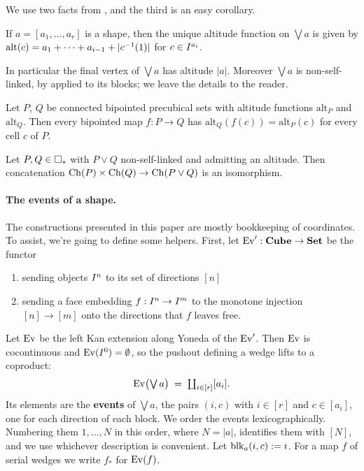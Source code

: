 \documentclass[11pt]{article}
\begin{document}
We use two facts from \cite{PZ}, and the third is an easy corollary.

\begin{lemma}[{\cite[Ex.~2.6(c)]{PZ}}]\label{lem:wedge-altitude}
  If $a = [a_1,\dots,a_r]$ is a shape, then the unique altitude function on $\bigvee a$ is given
  by $\mathrm{alt}(c) = a_1 + \cdots + a_{i-1} + |c^{-1}(1)|$ for $c \in I^{a_i}$.
\end{lemma}

In particular the final vertex of $\bigvee a$ has altitude $|a|$. Moreover $\bigvee a$ is
non-self-linked, by \cite[Prop.~2.10]{PZ} applied to its blocks; we leave the details to the
reader.

\begin{lemma}[{\cite[Prop.~2.7]{PZ}}]\label{lem:altitude-preserved}
  Let $P$, $Q$ be connected bipointed precubical sets with altitude functions $\mathrm{alt}_P$ and
  $\mathrm{alt}_Q$. Then every bipointed map $f : P \to Q$ has
  $\mathrm{alt}_Q(f(c)) = \mathrm{alt}_P(c)$ for every cell $c$ of $P$.
\end{lemma}

\begin{lemma}\label{lem:concat}
  Let $P, Q \in \square_{*}$ with $P \vee Q$ non-self-linked and admitting an altitude. Then
  concatenation $\operatorname{Ch}(P) \times \operatorname{Ch}(Q) \to \operatorname{Ch}(P \vee Q)$ is an isomorphism.
\end{lemma}

\paragraph{The events of a shape.}
The constructions presented in this paper are mostly bookkeeping of coordinates. 
To assist, we're going to define some helpers. First, let $\operatorname{Ev}' : \mathbf{Cube} \to \mathbf{Set}$ be the functor
\begin{enumerate}
  \item sending objects $I^{n}$ to its set of directions $[n]$
  \item sending a face embedding $f:I^{n} \to I^{m}$ to the monotone injection $[n] \to [m]$
    onto the directions that $f$ leaves free.
\end{enumerate}
Let $\operatorname{Ev}$ be the left Kan extension along Yoneda of the $\operatorname{Ev}'$.
Then $\operatorname{Ev}$ is cocontinuous and $\operatorname{Ev}(I^{0}) = \emptyset$, 
so the pushout defining a wedge lifts to a coproduct:
\[
  \operatorname{Ev}\bigl(\textstyle\bigvee a\bigr) \;=\; \coprod_{i \in [r]} [a_i] .
\]
Its elements are the \textbf{events} of $\bigvee a$, the pairs $(i,c)$ with $i \in [r]$ and
$c \in [a_i]$, one for each direction of each block. 
We order the events lexicographically. Numbering them $1, \dots, N$ in this order, where
$N = |a|$, identifies them with $[N]$, and we use whichever description is convenient.
Let $\operatorname{blk}_a(i,c) := i$. 
For a map $f$ of serial wedges we write $f_*$ for $\operatorname{Ev}(f)$.
\end{document}
